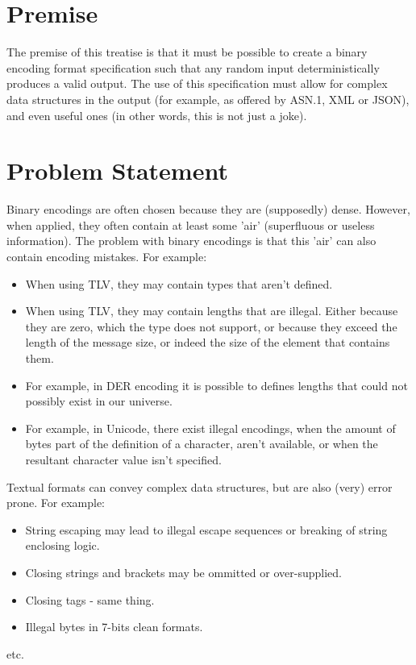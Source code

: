 \section{Premise}

The premise of this treatise is that it must be possible to create
a binary encoding format specification such that any random input 
deterministically produces a valid output.
The use of this specification must allow for complex data structures
in the output (for example, as offered by ASN.1, XML or JSON),
and even useful ones (in other words, this is not just a joke).

\section{Problem Statement}

Binary encodings are often chosen because they are (supposedly) dense.
However, when applied, they often contain at least some 'air'
(superfluous or useless information).
The problem with binary encodings is that this 'air' can also contain
encoding mistakes. For example:

\begin{itemize}
\item When using TLV, they may contain types that aren't defined.
\item When using TLV, they may contain lengths that are illegal.
  Either because they are zero, which the type does not support,
  or because they exceed the length of the message size, or indeed
  the size of the element that contains them.
\item For example, in DER encoding it is possible to defines lengths
  that could not possibly exist in our universe.
\item For example, in Unicode, there exist illegal encodings, when the
  amount of bytes part of the definition of a character, aren't
  available, or when the resultant character value isn't specified.
\end{itemize}

Textual formats can convey complex data structures, but are also
(very) error prone. For example:

\begin{itemize}
\item String escaping may lead to illegal escape sequences or breaking
  of string enclosing logic.
\item Closing strings and brackets may be ommitted or over-supplied.
\item Closing tags - same thing.
\item Illegal bytes in 7-bits clean formats.
\end{itemize}
etc.

